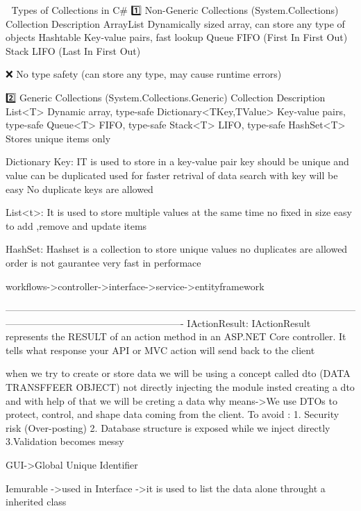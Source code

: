 🔹 Types of Collections in C#
1️⃣ Non-Generic Collections (System.Collections)
Collection	Description
ArrayList	Dynamically sized array, can store any type of objects
Hashtable	Key-value pairs, fast lookup
Queue	FIFO (First In First Out)
Stack	LIFO (Last In First Out)

❌ No type safety (can store any type, may cause runtime errors)

2️⃣ Generic Collections (System.Collections.Generic)
Collection	Description
List<T>	Dynamic array, type-safe
Dictionary<TKey,TValue>	Key-value pairs, type-safe
Queue<T>	FIFO, type-safe
Stack<T>	LIFO, type-safe
HashSet<T>	Stores unique items only


Dictionary Key:
IT is used to store in a key-value pair 
key should be unique and value can be duplicated
used for
                faster retrival of data
                search with key will be easy
                No duplicate keys are allowed

List<t>:
                It is used to store multiple values at the same time
                no fixed in size
                easy to add ,remove and update items

HashSet:
                Hashset is a collection to store unique values
                no duplicates are allowed
                order is not gaurantee 
                very fast in performace


workflows->controller->interface->service->entityframework





-------------------------------------------------------------------------------------------------------------------------------------------------------------------
IActionResult:
                IActionResult represents the RESULT of an action method in an ASP.NET Core controller.
                It tells what response your API or MVC action will send back to the client

when we try to create or store data
   we will be using a concept called dto (DATA TRANSFFEER OBJECT) not directly injecting the module insted creating a dto and with help of that we will be creting a data
   why means->We use DTOs to protect, control, and shape data coming from the client.
   To avoid :
           1. Security risk (Over-posting)
           2. Database structure is exposed while we inject directly
           3.Validation becomes messy


GUI->Global Unique Identifier

Iemurable
  ->used in Interface
  ->it is used to list the data alone throught a inherited class


